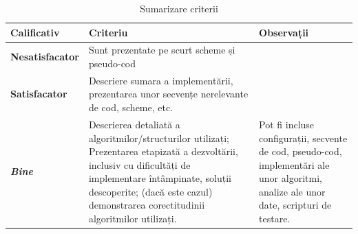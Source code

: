 \documentclass[12pt,a4paper]{report}
\begin{document}
\begin{table}[th]\small\linespread{1}
    \caption{Sumarizare criterii}
    \label{tab:criterii}
    \begin{tabular}{l >{\raggedright\arraybackslash}p{8cm} >{\raggedright\arraybackslash}p{4cm}}
        \textbf{Calificativ}    & \textbf{Criteriu}                                                                                                                                                                                                                                & \textbf{Observații}                                                                                                                     \\\hline
        \textbf{Nesatisfacator} & Sunt prezentate pe scurt scheme și pseudo-cod                                                                                                                                                                                                    &                                                                                                                                         \\\hline
        \textbf{Satisfacator}   & Descriere sumara a implementării, prezentarea unor secvențe nerelevante de cod, scheme, etc.                                                                                                                                                     &                                                                                                                                         \\
        \hline
        \textbf{\textit{Bine}}  & Descrierea detaliată a algoritmilor/structurilor utilizați; Prezentarea etapizată a dezvoltării, inclusiv cu dificultăți de implementare întâmpinate, soluții descoperite; (dacă este cazul) demonstrarea corectitudinii algoritmilor utilizați. & Pot fi incluse configurații, secvente de cod, pseudo-cod, implementări ale unor algoritmi, analize ale unor date, scripturi de testare. \\
        \hline
    \end{tabular}
\end{table}
\end{document}

